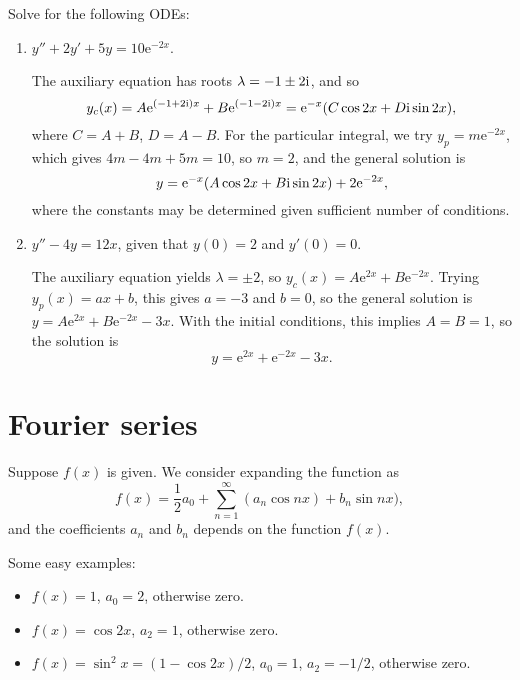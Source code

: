 \documentclass[letter-paper]{tufte-book}
\newenvironment{example}[1][Example]{\begin{trivlist}
\item[\hskip \labelsep {\bfseries #1}]}{\end{trivlist}}
\newcommand{\ex}{\mathrm{e}}
\newcommand{\zi}{{\rm i}}
\begin{document}
\begin{example}
  Solve for the following ODEs:
  \begin{enumerate}
    \item $y'' + 2y' + 5y = 10\ex^{-2x}$.
    
    The auxiliary equation has roots $\lambda = -1 \pm 2\zi$, and so
    \begin{equation*}
      y_c(x) = A\ex^{(-1 + 2\zi)x} + B\ex^{(-1 - 2\zi)x} =
      \ex^{-x}(C\cos 2x + D\zi\sin 2x),
    \end{equation*}
    where $C = A + B$, $D = A - B$. For the particular integral, we try $y_p =
    m\ex^{-2x}$, which gives $4m - 4m + 5m = 10$, so $m=2$, and the general
    solution is
    \begin{equation*}
      y = \ex^{-x}(A\cos2x + B\zi\sin 2x) + 2\ex^{-2x},
    \end{equation*}
    where the constants may be determined given sufficient number of conditions.
    
    \item $y'' - 4y = 12x$, given that $y(0) = 2$ and $y'(0) = 0$.
    
    The auxiliary equation yields $\lambda = \pm2$, so $y_c(x) = A\ex^{2x} +
    B\ex^{-2x}$. Trying $y_p(x) = ax+b$, this gives $a = -3$ and $b = 0$, so the
    general solution is $y = A\ex^{2x} + B\ex^{-2x} - 3x$. With the initial
    conditions, this implies $A = B = 1$, so the solution is
    \begin{equation*}
      y = \ex^{2x} + \ex^{-2x} - 3x.
    \end{equation*}
  \end{enumerate}
\end{example}

\chapter{Fourier series}

Suppose $f(x)$ is given. We consider expanding the function as
\begin{equation*}
  f(x) = \frac{1}{2}a_0 + \sum_{n=1}^\infty(a_n\cos nx) + b_n\sin nx),
\end{equation*}
and the coefficients $a_n$ and $b_n$ depends on the function $f(x)$.
\begin{example}
  Some easy examples:
  \begin{itemize}
    \item $f(x)=1$, $a_0=2$, otherwise zero.
    \item $f(x) = \cos2x$, $a_2=1$, otherwise zero.
    \item $f(x) = \sin^2 x = (1-\cos2x)/2$, $a_0=1$, $a_2=-1/2$, otherwise zero.
  \end{itemize}
\end{example}
\end{document}
